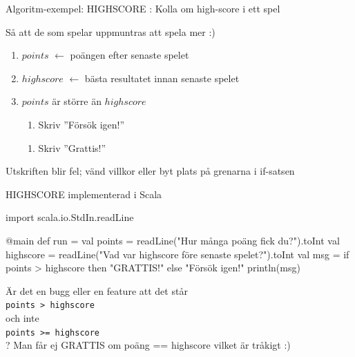 \ifkompendium\else
\begin{SlideExtra}{Algoritm-exempel: HIGHSCORE}
: Kolla om high-score i ett spel \\ \vspace{1em}

 \pause Så att de som spelar uppmuntras att spela mer :) \\ \vspace{1em}

\pause
\begin{enumerate}
\item $points$ $\leftarrow$ poängen efter senaste spelet
\item $highscore$ $\leftarrow$ bästa resultatet innan senaste spelet
\item {} $points$ är större än $highscore$ 
\begin{enumerate}[ ~~]
\item  Skriv ''Försök igen!''
\end{enumerate}
\begin{enumerate}[ ~~]
\item  Skriv ''Grattis!''
\end{enumerate}
\end{enumerate}
\pause
\scriptsize {}

\pause Utskriften blir fel; vänd villkor eller byt plats på grenarna i if-satsen
\end{SlideExtra}
\fi

\ifkompendium\else
\begin{SlideExtra}{HIGHSCORE implementerad i Scala}
\begin{Code}
import scala.io.StdIn.readLine

@main 
def run = 
  val points = readLine("Hur många poäng fick du?").toInt
  val highscore = readLine("Vad var highscore före senaste spelet?").toInt
  val msg = if points > highscore then "GRATTIS!" else "Försök igen!"
  println(msg)
\end{Code}
\SlideFontSmall %
\pause
Är det en bugg eller en feature att det står\\ \texttt{points > highscore} \\ och inte \\ \texttt{points >= highscore} \\ ?
\pause Man får ej GRATTIS om poäng == highscore vilket är tråkigt :)
\end{SlideExtra}



